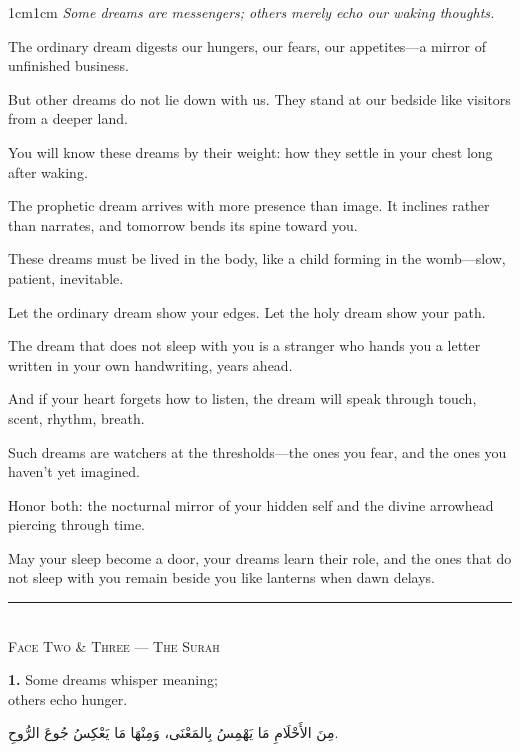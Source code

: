 \documentclass[11pt,a4paper,twoside]{book}
\begin{document}
\begin{adjustwidth}{1cm}{1cm}
\itshape
Some dreams are messengers; others merely echo our waking thoughts.

The ordinary dream digests our hungers, our fears, our appetites—a mirror of unfinished business.

But other dreams do not lie down with us. They stand at our bedside like visitors from a deeper land.

You will know these dreams by their weight: how they settle in your chest long after waking.

The prophetic dream arrives with more presence than image. It inclines rather than narrates, and tomorrow bends its spine toward you.

These dreams must be lived in the body, like a child forming in the womb—slow, patient, inevitable.

Let the ordinary dream show your edges. Let the holy dream show your path.

The dream that does not sleep with you is a stranger who hands you a letter written in your own handwriting, years ahead.

And if your heart forgets how to listen, the dream will speak through touch, scent, rhythm, breath.

Such dreams are watchers at the thresholds—the ones you fear, and the ones you haven't yet imagined.

Honor both: the nocturnal mirror of your hidden self and the divine arrowhead piercing through time.

May your sleep become a door, your dreams learn their role, and the ones that do not sleep with you remain beside you like lanterns when dawn delays.
\end{adjustwidth}

\vspace{2em}
\begin{center}
\rule{3cm}{0.4pt}\\[1em]
{\small\scshape Face Two \& Three — The Surah}
\end{center}
\vspace{1em}

{\color{indigo}\bfseries 1.}\quad
Some dreams whisper meaning;\\
others echo hunger.

\begin{flushright}
{\arabicfont
مِنَ الأَحْلَامِ مَا يَهْمِسُ بِالمَعْنَى،
وَمِنْهَا مَا يَعْكِسُ جُوعَ الرُّوحِ.}
\end{flushright}
\end{document}
